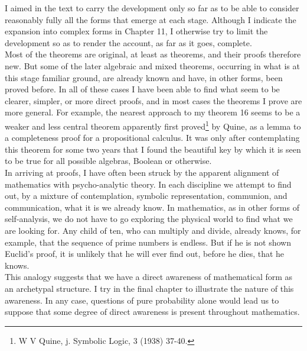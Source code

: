\documentclass[a4paper]{article}
\theoremstyle{remark}
\begin{document}
I  aimed  in  the  text  to  carry  the  development  only  so  far  as  to  be able to  consider  reasonably  fully  all the forms  that  emerge  at  each  stage. Although  I  indicate  the  expansion  into  complex  forms  in  Chapter   11, I  otherwise  try  to  limit  the  development  so  as  to  render  the  account,  as  far  as  it  goes,  complete. \\

Most  of  the  theorems  are  original,  at  least  as  theorems,  and  their   proofs   therefore   new.   But  some   of   the  later   algebraic   and  mixed  theorems,  occurring  in  what  is at  this  stage  familiar  ground,   are  already   known   and   have,  in  other   forms,   been   proved  before.  In  all  of these  cases  I have been  able to  find  what  seem  to  be  clearer,  simpler,  or  more  direct  proofs,  and  in  most  cases  the  theorems  I  prove  are  more  general.  For  example,  the  nearest  approach  to  my  theorem   16  seems  to  be  a  weaker  and  less  central  theorem  apparently  first  proved\footnote{W V Quine, j. Symbolic Logic, 3 (1938) 37-40.}  by  Quine,  as   a   lemma  to   a  completeness  proof for a propositional calculus. It was only after contemplating  this theorem  for  some two  years  that  I  found  the  beautiful  key  by  which  it  is  seen  to  be  true  for  all  possible  algebras,  Boolean  or  otherwise. \\

In  arriving  at proofs,  I have often  been  struck  by the  apparent  alignment   of   mathematics   with   psycho-analytic   theory.   In   each  discipline  we  attempt  to  find  out,  by  a  mixture  of  contemplation,   symbolic   representation,   communion,   and   communication,  what  it  is  we  already  know.  In  mathematics,  as  in  other  forms  of  self-analysis,  we  do  not  have  to  go  exploring  the  physical  world  to  find  what  we  are  looking  for.  Any  child  of ten, who can multiply and  divide, already knows, for  example, that  the  sequence  of  prime  numbers  is endless.  But  if he  is not shown  Euclid's  proof,  it  is  unlikely  that  he  will  ever  find  out,  before  he  dies, that  he  knows. \\

This  analogy   suggests  that  we  have  a  direct  awareness  of  mathematical  form  as an  archetypal  structure.  I  try in the  final  chapter  to  illustrate  the  nature  of  this  awareness.  In  any  case,  questions  of  pure  probability  alone  would  lead  us  to  suppose  that   some  degree  of  direct   awareness   is  present   throughout   mathematics. \\
\end{document}
